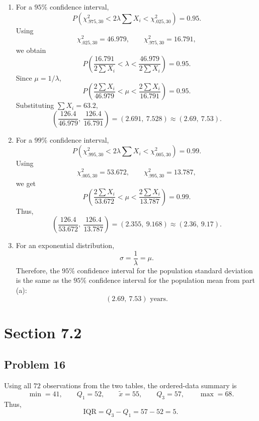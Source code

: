 \documentclass[11pt]{article}
\begin{document}
\begin{enumerate}
\item[(a)] For a $95\%$ confidence interval,
\[
P\left(\chi^2_{.975,30}<2\lambda\sum X_i<\chi^2_{.025,30}\right)=0.95.
\]
Using
\[
\chi^2_{.025,30}=46.979, \qquad \chi^2_{.975,30}=16.791,
\]
we obtain
\[
P\left(\frac{16.791}{2\sum X_i}<\lambda<\frac{46.979}{2\sum X_i}\right)=0.95.
\]
Since $\mu=1/\lambda$,
\[
P\left(\frac{2\sum X_i}{46.979}<\mu<\frac{2\sum X_i}{16.791}\right)=0.95.
\]
Substituting $\sum X_i=63.2$,
\[
\left(\frac{126.4}{46.979},\ \frac{126.4}{16.791}\right)=(2.691,\ 7.528)\approx(2.69,\ 7.53).
\]

\item[(b)] For a $99\%$ confidence interval,
\[
P\left(\chi^2_{.995,30}<2\lambda\sum X_i<\chi^2_{.005,30}\right)=0.99.
\]
Using
\[
\chi^2_{.005,30}=53.672, \qquad \chi^2_{.995,30}=13.787,
\]
we get
\[
P\left(\frac{2\sum X_i}{53.672}<\mu<\frac{2\sum X_i}{13.787}\right)=0.99.
\]
Thus,
\[
\left(\frac{126.4}{53.672},\ \frac{126.4}{13.787}\right)=(2.355,\ 9.168)\approx(2.36,\ 9.17).
\]

\item[(c)] For an exponential distribution,
\[
\sigma=\frac{1}{\lambda}=\mu.
\]
Therefore, the $95\%$ confidence interval for the population standard deviation is the same as the $95\%$ confidence interval for the population mean from part (a):
\[
(2.69,\ 7.53)\text{ years}.
\]
\end{enumerate}

\section*{Section 7.2}

\subsection*{Problem 16}

Using all $72$ observations from the two tables, the ordered-data summary is
\[
\min=41, \qquad Q_1=52, \qquad \tilde{x}=55, \qquad Q_3=57, \qquad \max=68.
\]
Thus,
\[
\text{IQR}=Q_3-Q_1=57-52=5.
\]
\end{document}
